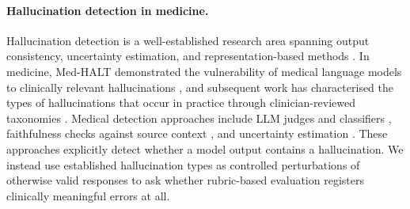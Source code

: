 \documentclass{article}
\begin{document}
\paragraph{Hallucination detection in medicine.} Hallucination detection is a well-established research area spanning output consistency, uncertainty estimation, and representation-based methods \citep{ji_hall_survey_2023, manakul2023selfcheckgptn, farquhar2024_semantic_entropy, azaria-mitchell-2023-internal}. In medicine, Med-HALT demonstrated the vulnerability of medical language models to clinically relevant hallucinations \citep{pal2023medhaltmedicaldomainhallucination}, and subsequent work has characterised the types of hallucinations that occur in practice through clinician-reviewed taxonomies \citep{asgari2025framework, kim_medical_2025}. Medical detection approaches include LLM judges and classifiers \citep{pandit_medhallu_2025, abacha_medec_2025, aali_medval_2025}, faithfulness checks against source context \citep{asgari2025framework}, and uncertainty estimation \citep{savage_large_2025}. These approaches explicitly detect whether a model output contains a hallucination. We instead use established hallucination types as controlled perturbations of otherwise valid responses to ask whether rubric-based evaluation registers clinically meaningful errors at all.
\end{document}
